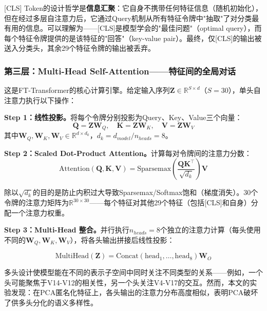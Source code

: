 [CLS] Token的设计哲学是\textbf{信息汇聚}：它自身不携带任何特征信息（随机初始化），但在经过多层自注意力后，它通过Query机制从所有特征令牌中"抽取"了对分类最有用的信息。可以理解为——[CLS]是模型学会的"最佳问题"（optimal query），而每个特征令牌提供的是该特征的"回答"（key-value pair）。最终，仅[CLS]的输出被送入分类头，其余29个特征令牌的输出被丢弃。

\subsubsection{第三层：Multi-Head Self-Attention——特征间的全局对话}

这是FT-Transformer的核心计算引擎。给定输入序列$\mathbf{Z} \in \mathbb{R}^{S \times d}$（$S=30$），单头自注意力执行以下操作：

\textbf{Step 1：线性投影。}将每个令牌分别投影为Query、Key、Value三个向量：
\begin{equation}
\mathbf{Q} = \mathbf{Z}\mathbf{W}_Q,\quad \mathbf{K} = \mathbf{Z}\mathbf{W}_K,\quad \mathbf{V} = \mathbf{Z}\mathbf{W}_V
\end{equation}
其中$\mathbf{W}_Q, \mathbf{W}_K, \mathbf{W}_V \in \mathbb{R}^{d \times d_k}$，$d_k = d_{model} / n_{heads} = 8$。

\textbf{Step 2：Scaled Dot-Product Attention。}计算每对令牌间的注意力分数：
\begin{equation}
\mathrm{Attention}(\mathbf{Q}, \mathbf{K}, \mathbf{V}) = \mathrm{Sparsemax}\!\left(\frac{\mathbf{Q}\mathbf{K}^\top}{\sqrt{d_k}}\right) \mathbf{V}
\label{eq:attention}
\end{equation}

除以$\sqrt{d_k}$的目的是防止内积过大导致Sparsemax/Softmax饱和（梯度消失）。30个令牌的注意力矩阵为$\mathbb{R}^{30 \times 30}$——每个特征对其他29个特征（包括[CLS]和自身）分配一个注意力权重。

\textbf{Step 3：Multi-Head 整合。}并行执行$n_{heads}=8$个独立的注意力计算（每头使用不同的$\mathbf{W}_Q, \mathbf{W}_K, \mathbf{W}_V$），将各头输出拼接后线性投影：

\begin{equation}
\mathrm{MultiHead}(\mathbf{Z}) = \mathrm{Concat}(\mathrm{head}_1, \dots, \mathrm{head}_8) \mathbf{W}_O
\end{equation}

多头设计使模型能在不同的表示子空间中同时关注不同类型的关系——例如，一个头可能聚焦于V14-V12的相关性，另一个头关注V4-V17的交互。然而，本文的实验发现：在PCA匿名化特征上，各头输出的注意力分布高度相似，表明PCA破坏了供多头分化的语义多样性。

